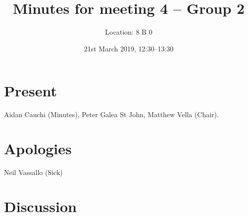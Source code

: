 \documentclass[11pt,a4paper]{article}
\title{ Minutes for meeting 4 -- Group 2}
\author{Location: 8 B 0}
\date{21st March 2019, 12:30--13:30}
\begin{document}
\maketitle

\section*{Present}
Aidan Cauchi (Minutes),
Peter Galea St John,
Matthew Vella (Chair).

\section*{Apologies}
Neil Vassallo (Sick)


\section*{Discussion}
\end{document}
